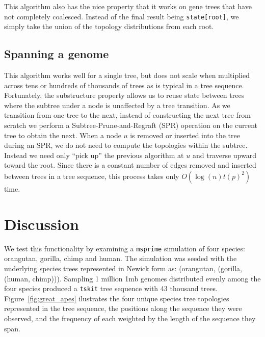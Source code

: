 \documentclass{article}
\newcommand{\tskit}{{\texttt{tskit}}}
\newcommand{\msprime}{{\texttt{msprime}}}
\begin{document}
This algorithm also has the nice property that it works on gene trees
that have not completely coalesced. Instead of the final result being
\texttt{state[root]}, we simply take the union of the topology distributions
from each root.

\subsection{Spanning a genome}
This algorithm works well for a single tree, but does not scale when multiplied
across tens or hundreds of thousands of trees as is typical in a tree sequence.
Fortunately, the substructure property allows us to reuse state between trees
where the subtree under a node is unaffected by a tree transition.
As we transition from one tree to the next, instead of constructing
the next tree from scratch we perform a Subtree-Prune-and-Regraft (SPR) operation
on the current tree to obtain the next.
When a node $u$ is removed or inserted into the tree during an SPR, we do not
need to compute the topologies within the subtree.
Instead we need only ``pick up'' the previous algorithm at $u$ and traverse
upward toward the root.
Since there is a constant number of edges removed and inserted between trees
in a tree sequence, this process takes only $O(\log(n)t(p)^2)$ time.

\section{Discussion}
We test this functionality by examining a \msprime{} simulation of four species:
orangutan, gorilla, chimp and human. The simulation was seeded with the underlying
species trees represented in Newick form as: (orangutan, (gorilla, (human, chimp))).
Sampling 1 million 1mb genomes distributed evenly among the four species
produced a \tskit{} tree sequence with 43 thousand trees.
Figure~\ref{fig:great_apes} ilustrates the four unique
species tree topologies represented in the tree sequence, the positions
along the sequence they were observed, and the frequency of each weighted by
the length of the sequence they span.
\end{document}
